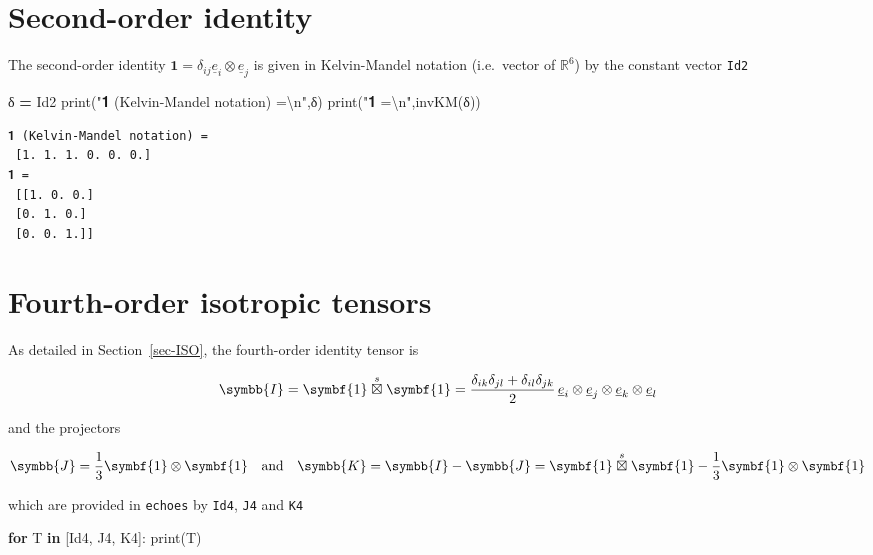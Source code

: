 \documentclass[
  a4paper,
  numbers=noendperiod,
  DIV=12]{scrreprt}
\newenvironment{Shaded}{\begin{snugshade}}{\end{snugshade}}
\newcommand{\BuiltInTok}[1]{#1}
\newcommand{\CharTok}[1]{\textcolor[rgb]{0.31,0.60,0.02}{#1}}
\newcommand{\ControlFlowTok}[1]{\textcolor[rgb]{0.13,0.29,0.53}{\textbf{#1}}}
\newcommand{\KeywordTok}[1]{\textcolor[rgb]{0.13,0.29,0.53}{\textbf{#1}}}
\newcommand{\NormalTok}[1]{#1}
\newcommand{\OperatorTok}[1]{\textcolor[rgb]{0.81,0.36,0.00}{\textbf{#1}}}
\newcommand{\StringTok}[1]{\textcolor[rgb]{0.31,0.60,0.02}{#1}}
\newcommand{\R}{{\mathbb{{R}}}}
\newcommand{\uu}[1]{{\symbf{{#1}}}}
\newcommand{\uuuu}[1]{{\symbb{{#1}}}}
\newcommand{\uv}[1]{{\underline{{#1}}}}
\newcommand{\ve}[1]{{\uv{{e}}_{{#1}}}}
\newcommand{\sboxtimes}{\stackrel{s}{\boxtimes}}
\begin{document}
\section{Second-order identity}\label{second-order-identity}

The second-order identity \(\uu{1}=\delta_{ij}\ve{i}\otimes\ve{j}\) is
given in Kelvin-Mandel notation (i.e.~vector of \(\R^6\)) by the
constant vector \texttt{Id2}

\begin{Shaded}
\begin{Highlighting}[]
\NormalTok{δ }\OperatorTok{=}\NormalTok{ Id2}
\BuiltInTok{print}\NormalTok{(}\StringTok{"𝟏 (Kelvin{-}Mandel notation) =}\CharTok{\textbackslash{}n}\StringTok{"}\NormalTok{,δ)}
\BuiltInTok{print}\NormalTok{(}\StringTok{"𝟏 =}\CharTok{\textbackslash{}n}\StringTok{"}\NormalTok{,invKM(δ))}
\end{Highlighting}
\end{Shaded}

\begin{verbatim}
𝟏 (Kelvin-Mandel notation) =
 [1. 1. 1. 0. 0. 0.]
𝟏 =
 [[1. 0. 0.]
 [0. 1. 0.]
 [0. 0. 1.]]
\end{verbatim}

\section{Fourth-order isotropic
tensors}\label{fourth-order-isotropic-tensors}

As detailed in Section~\ref{sec-ISO}, the fourth-order identity tensor
is

\[
\uuuu{I}=\uu{1}\sboxtimes\uu{1}=
\frac{\delta_{ik}\delta_{jl}+\delta_{il}\delta_{jk}}{2}\,\ve{i}\otimes\ve{j}\otimes\ve{k}\otimes\ve{l}
\]

and the projectors

\[
\uuuu{J}=\frac{1}{3}\uu{1}\otimes\uu{1}
\quad \textrm{and} \quad
\uuuu{K}=\uuuu{I}-\uuuu{J}=\uu{1}\sboxtimes\uu{1}-\frac{1}{3}\uu{1}\otimes\uu{1}
\]

which are provided in \texttt{echoes} by \texttt{Id4}, \texttt{J4} and
\texttt{K4}

\begin{Shaded}
\begin{Highlighting}[]
\ControlFlowTok{for}\NormalTok{ T }\KeywordTok{in}\NormalTok{ [Id4, J4, K4]:}
    \BuiltInTok{print}\NormalTok{(T)}
\end{Highlighting}
\end{Shaded}
\end{document}
